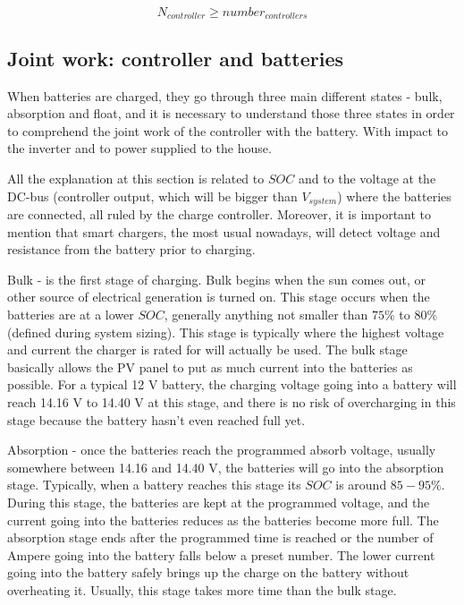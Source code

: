 \documentclass[journal]{IEEEtran}
\begin{document}
\begin{equation}
\label{eq:numberofc}
N_{controller} \geq number_{controllers}
\end{equation}

\subsection{Joint work: controller and batteries}
When batteries are charged, they go through three main different states - bulk, absorption and float, and it is necessary to understand those three states in order to comprehend the joint work of the controller with the battery. With impact to the inverter and to power supplied to the house. 

All the explanation at this section is related to $SOC$ and to the voltage at the DC-bus (controller output, which will be bigger than $V_{system}$) where the batteries are connected, all ruled by the charge controller. Moreover, it is important to mention that smart chargers, the most usual nowadays, will detect voltage and resistance from the battery prior to charging.

Bulk - is the first stage of charging. Bulk begins when the sun comes out, or other source of electrical generation is turned on. This stage occurs when the batteries are at a lower $SOC$, generally anything not smaller than $75\%$ to $80\%$ (defined during system sizing). This stage is typically where the highest voltage and current the charger is rated for will actually be used. The bulk stage basically allows the PV panel to put as much current into the batteries as possible. For a typical 12 V battery, the charging voltage going into a battery will reach 14.16 V to 14.40 V at this stage, and there is no risk of overcharging in this stage because the battery hasn't even reached full yet.

Absorption - once the batteries reach the programmed absorb voltage, usually somewhere between 14.16 and 14.40 V, the batteries will go into the absorption stage. Typically, when a battery reaches this stage its $SOC$ is around $85-95\%$. During this stage, the batteries are kept at the programmed voltage, and the current going into the batteries reduces as the batteries become more full. The absorption stage ends after the programmed time is reached or the number of Ampere going into the battery falls below a preset number. The lower current going into the battery safely brings up the charge on the battery without overheating it. Usually, this stage takes more time than the bulk stage.
\end{document}
